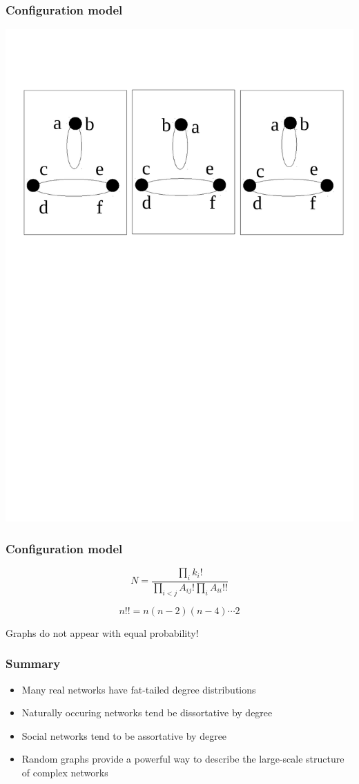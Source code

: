 \documentclass{beamer}
\begin{document}
\begin{frame}
    \frametitle{Configuration model}
    \centering
    \includegraphics[width=\columnwidth]{dumbelled.pdf}
\end{frame}
\begin{frame}
    \frametitle{Configuration model}
    \centering
    $$N = \frac{\prod_i k_i!}{\prod_{i<j}A_{ij}!\prod_i A_{ii}!!}$$

    \vspace{2em}
    $$n!! = n(n-2)(n-4)\cdots 2$$

    \vspace{2em}
    Graphs do not appear with equal probability!
\end{frame}
\begin{frame}
    \frametitle{Summary}
    \centering
    \begin{itemize}
    \setlength\itemsep{1em}
        \item{Many real networks have fat-tailed degree distributions}
        \item{Naturally occuring networks tend be dissortative by degree}
        \item{Social networks tend to be assortative by degree}
        \item{Random graphs provide a powerful way to describe the large-scale structure of complex networks}
    \end{itemize}
\end{frame}
\end{document}
